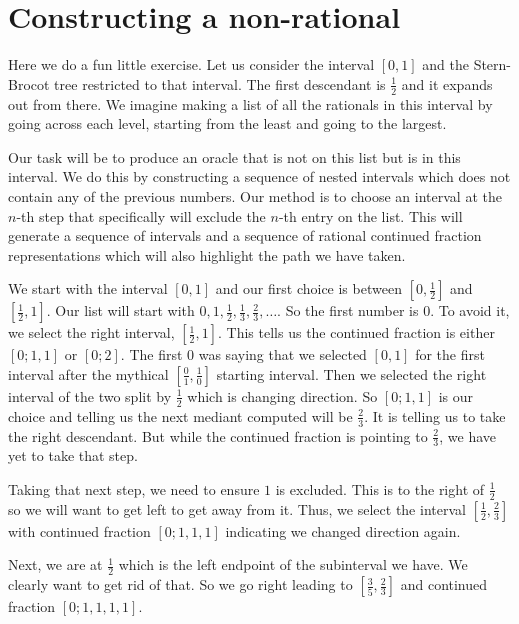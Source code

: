 \documentclass[12pt]{article}
\begin{document}
\medskip 

\appendix 

\section{Constructing a non-rational} \label{app:uncountable}

Here we do a fun little exercise. Let us consider the interval $[0,1]$ and the Stern-Brocot tree restricted to that interval. The first descendant is $\frac{1}{2}$ and it expands out from there. We imagine making a list of all the rationals in this interval by going across each level, starting from the least and going to the largest. 

Our task will be to produce an oracle that is not on this list but is in this interval. We do this by constructing a sequence of nested intervals which does not contain any of the previous numbers. Our method is to choose an interval at the $n$-th step that specifically will exclude the $n$-th entry on the list. This will generate a sequence of intervals and a sequence of rational continued fraction representations which will also highlight the path we have taken. 

We start with the interval $[0,1]$ and our first choice is between $[0,\frac{1}{2}]$ and $[\frac{1}{2}, 1]$. Our list will start with $0, 1, \frac{1}{2}, \frac{1}{3}, \frac{2}{3}, \ldots$. So the first number is $0$. To avoid it, we select the right interval, $[\frac{1}{2}, 1]$. This tells us the continued fraction is either $[0;1,1]$ or $[0;2]$. The first $0$ was saying that we selected $[0,1]$ for the first interval after the mythical $[\frac{0}{1}, \frac{1}{0}]$ starting interval. Then we selected the right interval of the two split by $\frac{1}{2}$ which is changing direction. So $[0;1,1]$ is our choice and telling us the next mediant computed will be $\frac{2}{3}$. It is telling us to take the right descendant. But while the continued fraction is pointing to $\frac{2}{3}$, we have yet to take that step. 

Taking that next step, we need to ensure $1$ is excluded. This is to the right of $\frac{1}{2}$ so we will want to get left to get away from it. Thus, we select the interval $[\frac{1}{2}, \frac{2}{3}]$ with continued fraction $[0;1,1,1]$ indicating we changed direction again. 

Next, we are at $\frac{1}{2}$ which is the left endpoint of the subinterval we have. We clearly want to get rid of that. So we go right leading to $[\frac{3}{5}, \frac{2}{3}]$ and continued fraction $[0; 1, 1, 1, 1]$. 
\end{document}

